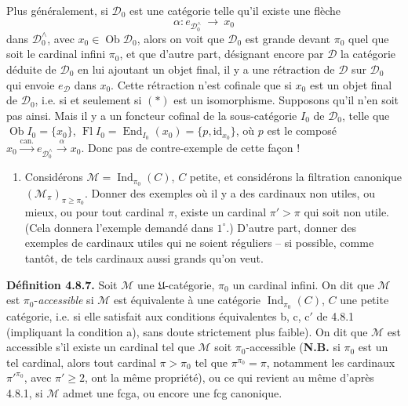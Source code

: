 \documentclass[11pt]{article}
\newcommand{\msp}[1]{\marginpar{\footnotesize [#1]}}
\newcommand{\Fl}{\operatorname{Fl}}
\newcommand{\Ob}{\operatorname{Ob}}
\newcommand{\Ind}{\operatorname{Ind}}
\newcommand{\End}{\operatorname{End}}
\begin{document}
Plus généralement, si $\mathcal{D}_0$ est une catégorie telle qu'il existe une flèche
\[
\alpha : e_{\mathcal{D}_0^\wedge} \ \longrightarrow \ x_0 \tag*{$(*)$}
\]
dans $\mathcal{D}_0^\wedge$, avec $x_0\in\Ob\mathcal{D}_0$, alors on voit que $\mathcal{D}_0$ est grande devant $\pi_0$ quel que soit le cardinal infini $\pi_0$, et que d'autre part, désignant encore par $\mathcal{D}$ la catégorie déduite de $\mathcal{D}_0$ en lui ajoutant un objet final, il y a une rétraction de $\mathcal{D}$ sur $\mathcal{D}_0$ qui envoie $e_{\mathcal{D}}$ dans $x_0$. Cette rétraction n'est cofinale que si $x_0$ est un objet final de $\mathcal{D}_0$, i.e. si et seulement si $(*)$ est un isomorphisme. Supposons qu'il n'en soit pas ainsi. Mais il y a un foncteur cofinal de la sous-catégorie $I_0$ de $\mathcal{D}_0$, telle que $\Ob I_0=\{x_0\}$, $\Fl I_0=\End_{I_0}(x_0)=\{p,\mathrm{id}_{x_0}\}$, où $p$ est le composé $x_0\xrightarrow{\text{can.}}e_{\mathcal{D}_0^\wedge}\xrightarrow{\alpha}x_0$. Donc pas de contre-exemple de cette façon !

\msp{page 205}
\begin{enumerate}
\item[4)] Considérons $\mathcal{M}=\Ind_{\pi_0}(C)$, $C$ petite, et considérons la filtration canonique $(\mathcal{M}_\pi)_{\pi\geqslant\pi_0}$. Donner des exemples où il y a des cardinaux non utiles, ou mieux, ou pour tout cardinal $\pi$, existe un cardinal $\pi'>\pi$ qui soit non utile. (Cela donnera l'exemple demandé dans $1^\circ$.) D'autre part, donner des exemples de cardinaux utiles qui ne soient réguliers -- si possible, comme tantôt, de tels cardinaux aussi grands qu'on veut.
\end{enumerate}

\textbf{Définition 4.8.7.} Soit $\mathcal{M}$ une $\mathfrak{U}$-catégorie, $\pi_0$ un cardinal infini. On dit que $\mathcal{M}$ est $\pi_0$-\textit{accessible} si $\mathcal{M}$ est équivalente à une catégorie $\Ind_{\pi_0}(C)$, $C$ une petite catégorie, i.e. si elle satisfait aux conditions équivalentes b, c, c$'$ de 4.8.1 (impliquant la condition a), sans doute strictement plus faible). On dit que $\mathcal{M}$ est accessible s'il existe un cardinal tel que $\mathcal{M}$ soit $\pi_0$-accessible (\textbf{N.B.} si $\pi_0$ est un tel cardinal, alors tout cardinal $\pi>\pi_0$ tel que $\pi^{\pi_0}=\pi$, notamment les cardinaux $\pi'^{\pi_0}$, avec $\pi'\geqslant 2$, ont la même propriété), ou ce
\msp{page 206}
qui revient au même d'après 4.8.1, si $\mathcal{M}$ admet une fcga, ou encore une fcg canonique.
\end{document}
